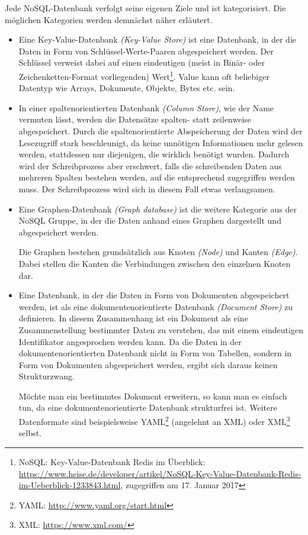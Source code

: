 Jede NoSQL-Datenbank verfolgt seine eigenen Ziele und ist kategorisiert. Die möglichen Kategorien werden demnächst näher erläutert.

\begin{itemize}
\item Eine Key-Value-Datenbank \textit{(Key-Value Store)} ist eine Datenbank, in der die Daten in Form von Schlüssel-Werte-Paaren abgespeichert werden. Der Schlüssel verweist dabei auf einen eindeutigen (meist in Binär- oder Zeichenketten-Format vorliegenden) Wert\footnote{NoSQL: Key-Value-Datenbank Redis im Überblick: \url{https://www.heise.de/developer/artikel/NoSQL-Key-Value-Datenbank-Redis-im-Ueberblick-1233843.html}, zugegriffen am 17. Januar 2017}. Value kann oft beliebiger Datentyp wie Arrays, Dokumente, Objekte, Bytes etc. sein.

\item In einer spaltenorientierten Datenbank \textit{(Column Store)}, wie der Name vermuten lässt, werden die Datensätze spalten- statt zeilenweise abgespeichert. Durch die spaltenorientierte Abspeicherung der Daten wird der Lesezugriff stark beschleunigt, da keine unnötigen Informationen mehr gelesen werden, stattdessen nur diejenigen, die wirklich benötigt wurden. Dadurch wird der Schreibprozess aber erschwert, falls die schreibenden Daten aus mehreren Spalten bestehen werden, auf die entsprechend zugegriffen werden muss. Der Schreibprozess wird sich in diesem Fall etwas verlangsamen.

\item Eine Graphen-Datenbank \textit{(Graph database)} ist die weitere Kategorie aus der NoSQL Gruppe, in der die Daten anhand eines Graphen dargestellt und abgespeichert werden.

Die Graphen bestehen grundsätzlich aus Knoten \textit{(Node)} und Kanten \textit{(Edge)}. Dabei stellen die Kanten die Verbindungen zwischen den einzelnen Knoten dar.

\item Eine Datenbank, in der die Daten in Form von Dokumenten abgespeichert werden, ist als eine dokumentenorientierte Datenbank \textit{(Document Store)} zu definieren. In diesem Zusammenhang ist ein Dokument als eine Zusammenstellung bestimmter Daten zu verstehen, das mit einem eindeutigen Identifikator angesprochen werden kann. Da die Daten in der dokumentenorientierten Datenbank nicht in Form von Tabellen, sondern in Form von Dokumenten abgespeichert werden, ergibt sich daraus keinen Strukturzwang.

Möchte man ein bestimmtes Dokument erweitern, so kann man es einfach tun, da eine dokumentenorientierte Datenbank strukturfrei ist. Weitere Datenformate sind beispielsweise YAML\footnote{YAML: \url{http://www.yaml.org/start.html}} (angelehnt an XML) oder XML\footnote{XML: \url{https://www.xml.com/}} selbst. 
\end{itemize}

